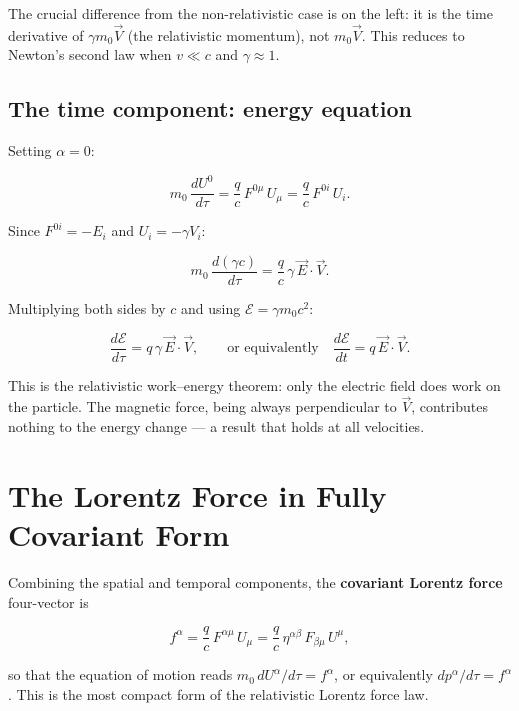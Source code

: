 The crucial difference from the non-relativistic case is on the left: it is the time derivative of $\gamma m_0 \vec{V}$ (the relativistic momentum), not $m_0\vec{V}$. This reduces to Newton's second law when $v \ll c$ and $\gamma \approx 1$.

\subsection*{The time component: energy equation}

Setting $\alpha = 0$:

\begin{equation}
m_0\,\frac{dU^0}{d\tau} = \frac{q}{c}\,F^{0\mu}\,U_\mu = \frac{q}{c}\,F^{0i}\,U_i.
\end{equation}

Since $F^{0i} = -E_i$ and $U_i = -\gamma V_i$:

\begin{equation}
m_0\,\frac{d(\gamma c)}{d\tau} = \frac{q}{c}\,\gamma\,\vec{E}\cdot\vec{V}.
\end{equation}

Multiplying both sides by $c$ and using $\mathcal{E} = \gamma m_0 c^2$:

\begin{equation}
\boxed{\frac{d\mathcal{E}}{d\tau} = q\,\gamma\,\vec{E}\cdot\vec{V}, \qquad \text{or equivalently} \quad \frac{d\mathcal{E}}{dt} = q\,\vec{E}\cdot\vec{V}.}
\end{equation}

This is the relativistic work--energy theorem: only the electric field does work on the particle. The magnetic force, being always perpendicular to $\vec{V}$, contributes nothing to the energy change --- a result that holds at all velocities.

\section{The Lorentz Force in Fully Covariant Form}

Combining the spatial and temporal components, the \textbf{covariant Lorentz force} four-vector is

\begin{equation}
\boxed{f^\alpha = \frac{q}{c}\,F^{\alpha\mu}\,U_\mu = \frac{q}{c}\,\eta^{\alpha\beta}\,F_{\beta\mu}\,U^\mu,}
\end{equation}

so that the equation of motion reads $m_0\,dU^\alpha/d\tau = f^\alpha$, or equivalently $dp^\alpha/d\tau = f^\alpha$. This is the most compact form of the relativistic Lorentz force law.

